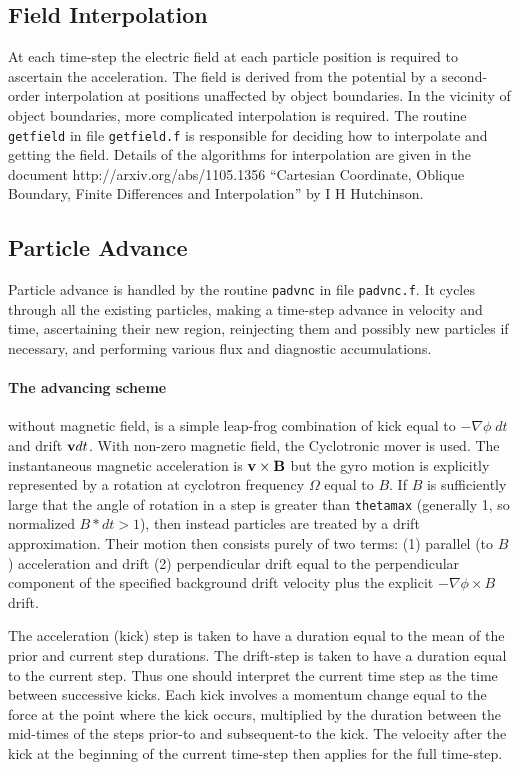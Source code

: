 \documentclass[12pt]{article}
\begin{document}
\subsection{Field Interpolation}

At each time-step the electric field at each particle position is
required to ascertain the acceleration. The field is derived from the
potential by a second-order interpolation at positions unaffected by
object boundaries. In the vicinity of object boundaries, more
complicated interpolation is required. The routine \verb!getfield! in
file \verb!getfield.f! is responsible for deciding how to interpolate
and getting the field. Details of the algorithms for interpolation are
given in the document http://arxiv.org/abs/1105.1356 ``Cartesian
Coordinate, Oblique Boundary, Finite Differences and Interpolation''
by I H Hutchinson.

\subsection{Particle Advance}

Particle advance is handled by the routine \verb!padvnc! in file
\verb!padvnc.f!. It cycles through all the existing particles, making
a time-step advance in velocity and time, ascertaining their new
region, reinjecting them and possibly new particles if necessary, and
performing various flux and diagnostic accumulations.

\paragraph{The advancing scheme} without magnetic field, is a simple
leap-frog combination of kick equal to $-\nabla\phi\;dt$ and drift
${\bf v} dt$. With non-zero magnetic field, the Cyclotronic mover is
used. The instantaneous magnetic acceleration is
${\bf v}\times{\bf B}$ but the gyro motion is explicitly represented
by a rotation at cyclotron frequency $\Omega$ equal to $B$. If $B$ is
sufficiently large that the angle of rotation in a step is greater
than \verb!thetamax! (generally 1, so normalized $B*dt>1$), then
instead particles are treated by a drift approximation. Their motion
then consists purely of two terms: (1) parallel (to $B$) acceleration
and drift (2) perpendicular drift equal to the perpendicular component
of the specified background drift velocity plus the explicit
$-\nabla\phi\times B$ drift.

The acceleration (kick) step is taken to have a duration equal to the
mean of the prior and current step durations. The drift-step is taken
to have a duration equal to the current step. Thus one should
interpret the current time step as the time between successive
kicks. Each kick involves a momentum change equal to the force at the
point where the kick occurs, multiplied by the duration between the
mid-times of the steps prior-to and subsequent-to the kick. The
velocity after the kick at the beginning of the current time-step then
applies for the full time-step.
\end{document}
